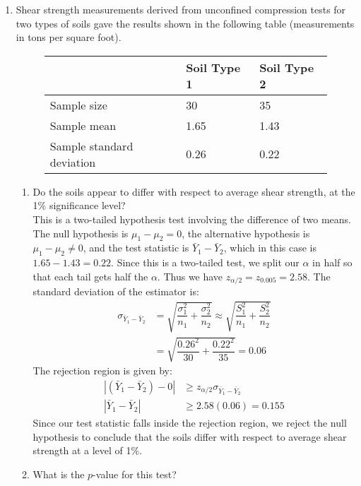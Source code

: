 \documentclass[12pt]{article}
\begin{document}
\begin{enumerate}
\item Shear strength measurements derived from unconfined compression tests for two types of soils gave the results shown in the following table (measurements in tons per square foot). 
\begin{figure}[H]
\centering
\begin{tabular}{l@{\hskip 2cm}l@{\hskip 2cm}l}
\toprule
& Soil Type 1 & Soil Type 2\\
\midrule
Sample size & 30 & 35 \\
Sample mean & 1.65 & 1.43 \\
Sample standard deviation & 0.26 & 0.22 \\
\bottomrule
\end{tabular}
\end{figure} 

\begin{enumerate}
\item Do the soils appear to differ with respect to average shear strength, at the 1\% significance level?\\

This is a two-tailed hypothesis test involving the difference of two means. The null hypothesis is $\mu_1 - \mu_2 = 0$, the alternative hypothesis is $\mu_1 - \mu_2 \neq 0$, and the test statistic is $\bar{Y}_1 - \bar{Y}_2$, which in this case is $1.65 - 1.43 = 0.22$. Since this is a two-tailed test, we split our $\alpha$ in half so that each tail gets half the $\alpha$. Thus we have $z_{\alpha/2} = z_{0.005} = 2.58$. The standard deviation of the estimator is:
\begin{align*}
\sigma_{\bar{Y}_1 - \bar{Y}_2} &= \sqrt{ \dfrac{\sigma^2_1}{n_1} + \dfrac{\sigma^2_2}{n_2} } \approx \sqrt{ \dfrac{S^2_1}{n_1} + \dfrac{S^2_2}{n_2} } \\
&= \sqrt{ \dfrac{0.26^2}{30} + \dfrac{0.22^2}{35} } = 0.06
\end{align*}
The rejection region is given by:
\begin{align*}
|(\bar{Y}_1 - \bar{Y}_2) - 0| &\geq z_{\alpha/2} \sigma_{\bar{Y}_1 - \bar{Y}_2} \\
|\bar{Y}_1 - \bar{Y}_2| &\geq 2.58 (0.06) = 0.155
\end{align*}
Since our test statistic falls inside the rejection region, we reject the null hypothesis to conclude that the soils differ with respect to average shear strength at a level of 1\%.

\item What is the $p$-value for this test?


\end{enumerate}
\end{enumerate}
\end{document}
